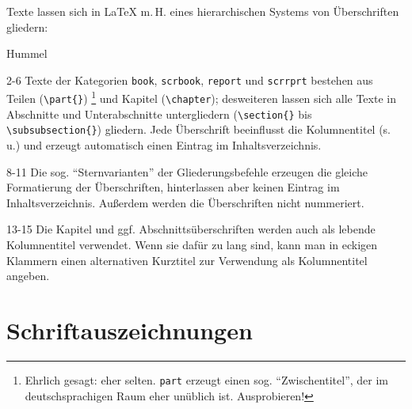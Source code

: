 Texte lassen sich in \LaTeX{} m.\,H. eines hierarchischen Systems von Überschriften gliedern:

\begin{labeling}{Hummel}
 \item[2-6] Texte der Kategorien 
    \lstinline/book/, 
    \lstinline/scrbook/, 
    \lstinline/report/ und 
    \lstinline/scrrprt/ 
 bestehen aus Teilen (\lstinline/\part{}/)
 \footnote{Ehrlich gesagt: eher selten. 
 \lstinline/part/ 
 erzeugt einen sog. \enquote{Zwischentitel},
 der im deutschsprachigen Raum eher unüblich ist. Ausprobieren! }
 und Kapitel (\lstinline/\chapter/);
 desweiteren lassen sich alle Texte in Abschnitte und Unterabschnitte untergliedern 
 (\lstinline/\section{}/ bis \lstinline/\subsubsection{}/) 
 gliedern.
 Jede Überschrift beeinflusst die Kolumnentitel (s.\,u.) und erzeugt automatisch einen Eintrag
 im Inhaltsverzeichnis.
 
 \item[8-11] Die sog. \enquote{Sternvarianten} der Gliederungsbefehle erzeugen die gleiche
 Formatierung der Überschriften, hinterlassen aber keinen Eintrag im Inhaltsverzeichnis.
 Außerdem werden die Überschriften nicht nummeriert.
 
 \item[13-15] Die Kapitel und ggf. Abschnittsüberschriften werden auch als lebende Kolumnentitel
 verwendet. Wenn sie dafür zu lang sind, kann man in eckigen Klammern einen alternativen
 Kurztitel zur Verwendung als Kolumnentitel angeben. 
\end{labeling}



\section{Schriftauszeichnungen}

